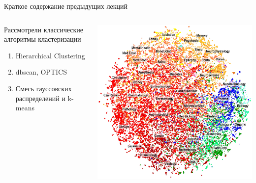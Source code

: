 \documentclass[aspectratio=169]{beamer}
\begin{document}
\begin{frame}{Краткое содержание предыдущих лекций}

\begin{columns}[]
    \begin{column}{.4\textwidth}
    	Рассмотрели классические алгоритмы кластеризации
		\begin{enumerate}
					\item Hierarchical Clustering
			\item dbscan, OPTICS
			\item Смесь гауссовских распределений и k-means
		\end{enumerate}

    \end{column}

    \begin{column}{.6\textwidth}
    \vspace{-0em}
	\begin{center}
   		\includegraphics[width=\textwidth]{images/medical.png}
    \end{center}
    \end{column}
  \end{columns}

\end{frame}

\end{document}
